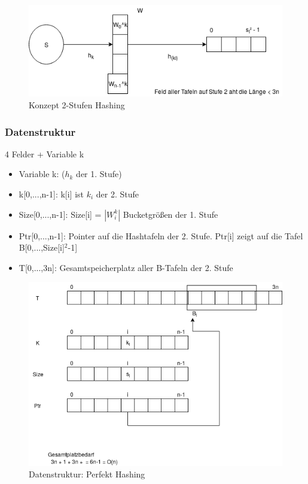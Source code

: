 \documentclass[ngerman]{scrartcl}
\begin{document}
\begin{figure}[h]
    \begin{center}
        \includegraphics[width=15cm]{2stufenhashing.png}
        \caption{Konzept 2-Stufen Hashing}
        \label{fig:}
    \end{center}
\end{figure}


\subsubsection{Datenstruktur} 4 Felder + Variable k
\begin{itemize}
    \item Variable k: ($ h_k $ der 1. Stufe)
    \item k[0,...,n-1]: k[i] ist $ k_i $ der 2. Stufe
    \item Size[0,...,n-1]: Size[i] = $ |W_i^k| $ Bucketgrößen der 1. Stufe
    \item Ptr[0,...,n-1]: Pointer auf die Hashtafeln der 2. Stufe. Ptr[i] zeigt auf die Tafel B[0,...,Size[i]$^2$-1]
    \item T[0,...,3n]: Gesamtspeicherplatz aller B-Tafeln der 2. Stufe
\end{itemize} 

\begin{figure}[h]
    \begin{center}
        \includegraphics[width=15cm]{datenstruktur.png}
        \caption{Datenstruktur: Perfekt Hashing}
        \label{fig:}
    \end{center}
\end{figure}
\end{document}
